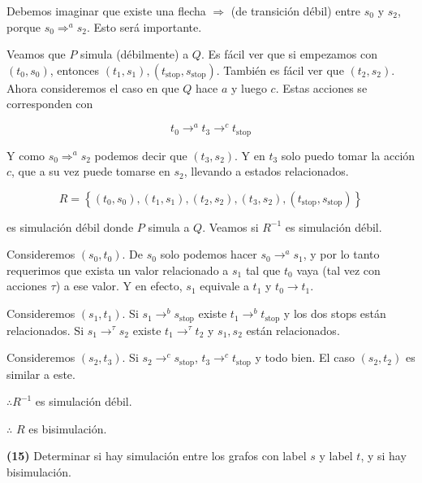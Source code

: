 \documentclass[a4paper, 12pt]{article}
\begin{document}
Debemos imaginar que existe una flecha $\Rightarrow$ (de transición débil) entre
$s_0$ y $s_2$, porque $s_0 \Rightarrow^a s_2$. Esto será importante.

Veamos que $P$ simula (débilmente) a $Q$. Es fácil ver que si empezamos con
$(t_0, s_0)$, entonces $(t_1, s_1), (t_{\text{stop}}, s_{\text{stop}})$. También
es fácil ver que $(t_2, s_2)$. Ahora consideremos el caso en que $Q$ hace $a$ y
luego $c$. Estas acciones se corresponden con 

\begin{equation*}
    t_0 \to^a t_3 \to^c  t_{\text{stop}}
\end{equation*}

Y como $s_0 \Rightarrow^a s_2 $ podemos decir que $(t_3, s_2)$. Y en $t_3$ solo
puedo tomar la acción $c$, que a su vez puede tomarse en $s_2$, llevando a
estados relacionados.

\begin{equation*}
    R = \left\{ (t_0, s_0), (t_1, s_1), (t_2, s_2), (t_3, s_2),
    (t_{\text{stop}}, s_{\text{stop}}) \right\} 
\end{equation*}

es simulación débil donde $P$ simula a $Q$. Veamos si $R^{-1}$ es simulación
débil.

Consideremos $(s_0, t_0)$. De $s_0$ solo podemos hacer $s_0 \to^a s_1$, y por lo
tanto requerimos que exista un valor relacionado a $s_1$ tal que $t_0$ vaya (tal
vez con acciones $\tau$) a ese valor. Y en efecto, $s_1$ equivale a $t_1$ y $t_0
\to t_1$.

Consideremos $(s_1, t_1)$. Si $s_1 \to^b s_{\text{stop}}$ existe $t_1 \to^b
t_{\text{stop}}$ y los dos stops están relacionados. Si $s_1 \to^\tau s_2$
existe $t_1 \to^\tau t_2$ y $s_1, s_2$ están relacionados. 

Consideremos $(s_2, t_3)$. Si $s_2 \to^c s_{\text{stop}}$, $t_3 \to^c
t_{\text{stop}}$ y todo bien. El caso $(s_2, t_2)$ es similar a este.

$\therefore R^{-1}$ es simulación débil. 

$\therefore $ $R$ es bisimulación.

\pagebreak 

\begin{myframe}
    \textbf{(15)} Determinar si hay simulación entre los grafos con label $s$ y
    label $t$, y si hay bisimulación.
\end{myframe}
\end{document}

